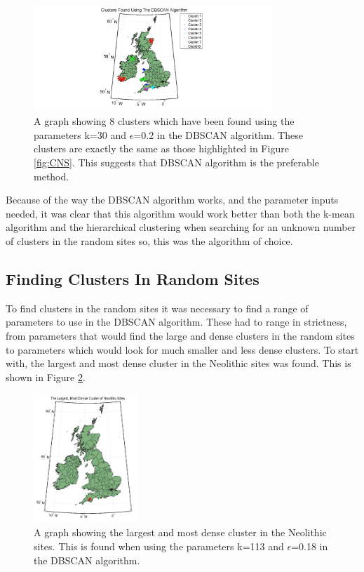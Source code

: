 \documentclass[a4paper]{article}
\begin{document}
\begin{figure}[H]
\centering
\includegraphics[width=0.8\textwidth]{CDB.png}
\caption{\label{fig:CDB} A graph showing 8 clusters which have been found using the parameters k=30 and $\epsilon$=0.2 in the DBSCAN algorithm. These clusters are exactly the same as those highlighted in Figure \ref{fig:CNS}. This suggests that DBSCAN algorithm is the preferable method.}
\end{figure}

Because of the way the DBSCAN algorithm works, and the parameter inputs needed, it was clear that this algorithm would work better than both the k-mean algorithm and the hierarchical clustering when searching for an unknown number of clusters in the random sites so, this was the algorithm of choice. 

\subsection{Finding Clusters In Random Sites}
To find clusters in the random sites it was necessary to find a range of parameters to use in the DBSCAN algorithm. These had to range in strictness, from parameters that would find the large and dense clusters in the random sites to parameters which would look for much smaller and less dense clusters. To start with, the largest and most dense cluster in the Neolithic sites was found. This is shown in Figure \ref{fig:LMDC}. 

\begin{figure}[H]
\centering
\includegraphics[width=0.35\textwidth]{LMDC.png}
\caption{\label{fig:LMDC} A graph showing the largest and most dense cluster in the Neolithic sites. This is found when using the parameters k=113 and $\epsilon$=0.18 in the DBSCAN algorithm.}
\end{figure}
\end{document}
